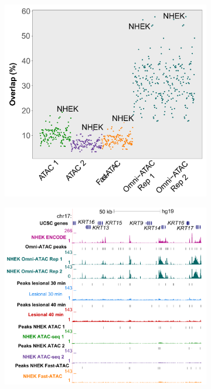 \begin{figure}[H]
\centering
\begin{subfigure}{0.40\textwidth}
\centering
\includegraphics[width=\textwidth]{./Results1/pdfs/ENCODE_125_cell_types_overlap_FAST_ATAC_Omni_ATAC_pval_2}
\caption{\textbf{}}
\end{subfigure}
\begin{subfigure}{0.65\textwidth}
\centering
\includegraphics[width=\textwidth]{./Results1/pdfs/ATAC_skin_all_tracks_KRT}

\end{subfigure}
\end{figure}
